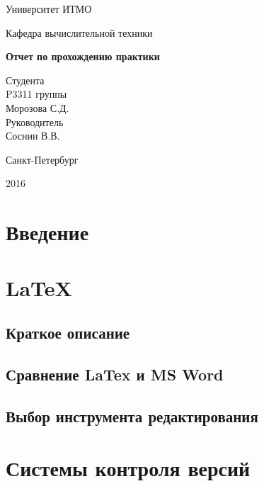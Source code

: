 \documentclass{article}
\begin{document}
\begin{titlepage}
	\centering
	{\LARGE Университет ИТМО \par}
	\vspace{1cm}
	{\Large Кафедра вычислительной техники\par}
	\vspace{1.5cm}
	{\huge\bfseries Отчет по прохождению практики\par}
	\vspace{3cm}
	\begin{flushleft}
		\hangindent=10cm
		\noindent 
		{\Large Студента\\
				P3311 группы \\
				Морозова С.Д.\\
				\vspace{1cm}
				Руководитель \\
				Соснин В.В.
		}
	\end{flushleft}
	\vfill
	\vspace{2.5cm}
	{\large Санкт-Петербург \par}
	{\large 2016  \par}
\end{titlepage}
	\setcounter{tocdepth}{3}
	\tableofcontents
	\newpage
	\section{Введение}	
	\section{LaTeX}
		\subsection{Краткое описание}
		\subsection{Сравнение LaTex и MS Word}
		\subsection{Выбор инструмента редактирования}
	\newpage
	\section{Системы контроля версий}
\end{document}

